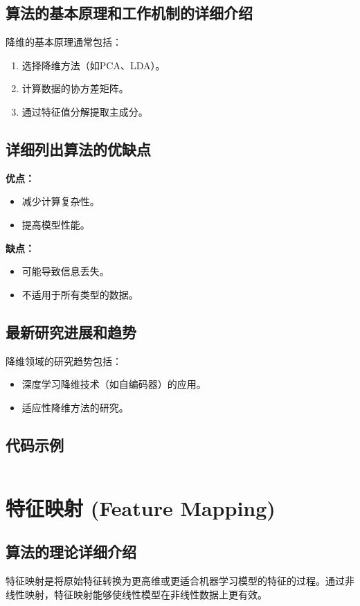 \subsection*{算法的基本原理和工作机制的详细介绍}
降维的基本原理通常包括：
\begin{enumerate}
    \item 选择降维方法（如PCA、LDA）。
    \item 计算数据的协方差矩阵。
    \item 通过特征值分解提取主成分。
\end{enumerate}

\subsection*{详细列出算法的优缺点}
\textbf{优点：}
\begin{itemize}
    \item 减少计算复杂性。
    \item 提高模型性能。
\end{itemize}

\textbf{缺点：}
\begin{itemize}
    \item 可能导致信息丢失。
    \item 不适用于所有类型的数据。
\end{itemize}

\subsection*{最新研究进展和趋势}
降维领域的研究趋势包括：
\begin{itemize}
    \item 深度学习降维技术（如自编码器）的应用。
    \item 适应性降维方法的研究。
\end{itemize}
\subsection*{代码示例}
\begin{lstlisting}

\end{lstlisting}


\section{特征映射 (Feature Mapping)}
\subsection*{算法的理论详细介绍}
特征映射是将原始特征转换为更高维或更适合机器学习模型的特征的过程。通过非线性映射，特征映射能够使线性模型在非线性数据上更有效。

